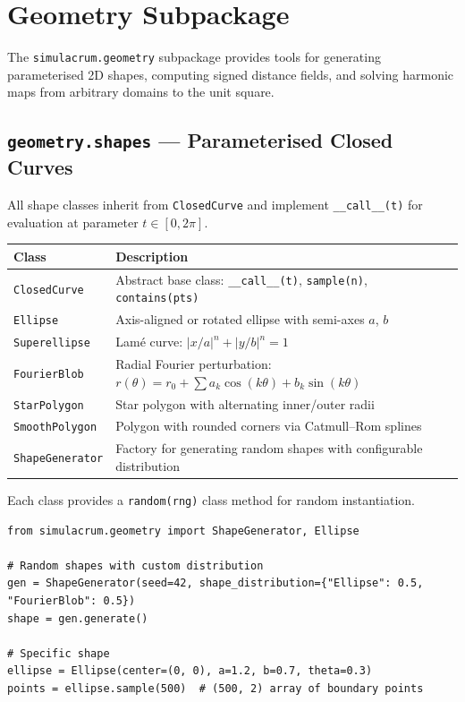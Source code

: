 \documentclass[11pt,a4paper]{report}
\begin{document}
\chapter{Geometry Subpackage}

The \texttt{simulacrum.geometry} subpackage provides tools for generating parameterised 2D shapes, computing signed distance fields, and solving harmonic maps from arbitrary domains to the unit square.

\section{\texttt{geometry.shapes} --- Parameterised Closed Curves}

All shape classes inherit from \texttt{ClosedCurve} and implement \texttt{\_\_call\_\_(t)} for evaluation at parameter $t \in [0, 2\pi]$.

\begin{longtable}{lp{8cm}}
\toprule
\textbf{Class} & \textbf{Description} \\
\midrule
\texttt{ClosedCurve} & Abstract base class: \texttt{\_\_call\_\_(t)}, \texttt{sample(n)}, \texttt{contains(pts)} \\
\texttt{Ellipse} & Axis-aligned or rotated ellipse with semi-axes $a$, $b$ \\
\texttt{Superellipse} & Lam\'e curve: $|x/a|^n + |y/b|^n = 1$ \\
\texttt{FourierBlob} & Radial Fourier perturbation: $r(\theta) = r_0 + \sum a_k \cos(k\theta) + b_k \sin(k\theta)$ \\
\texttt{StarPolygon} & Star polygon with alternating inner/outer radii \\
\texttt{SmoothPolygon} & Polygon with rounded corners via Catmull--Rom splines \\
\texttt{ShapeGenerator} & Factory for generating random shapes with configurable distribution \\
\bottomrule
\end{longtable}

Each class provides a \texttt{random(rng)} class method for random instantiation.

\begin{lstlisting}[caption={Generating and sampling shapes}]
from simulacrum.geometry import ShapeGenerator, Ellipse

# Random shapes with custom distribution
gen = ShapeGenerator(seed=42, shape_distribution={"Ellipse": 0.5, "FourierBlob": 0.5})
shape = gen.generate()

# Specific shape
ellipse = Ellipse(center=(0, 0), a=1.2, b=0.7, theta=0.3)
points = ellipse.sample(500)  # (500, 2) array of boundary points
\end{lstlisting}
\end{document}
